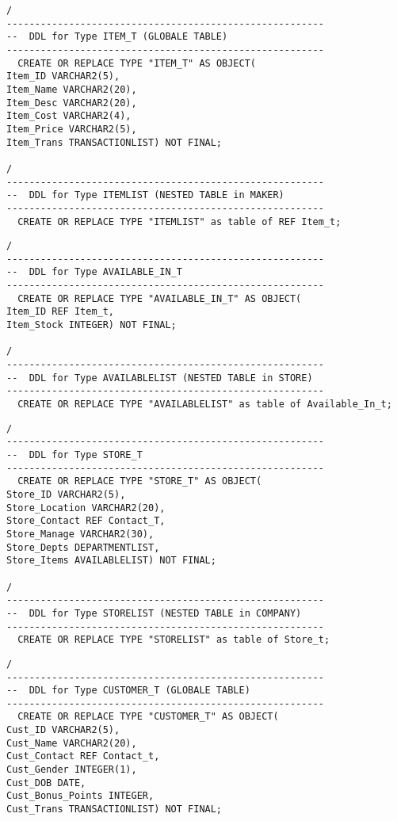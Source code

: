 \documentclass{scrartcl}
\begin{document}
\begin{lstlisting}
/
--------------------------------------------------------
--  DDL for Type ITEM_T (GLOBALE TABLE)
--------------------------------------------------------
  CREATE OR REPLACE TYPE "ITEM_T" AS OBJECT(
Item_ID VARCHAR2(5),
Item_Name VARCHAR2(20),
Item_Desc VARCHAR2(20),
Item_Cost VARCHAR2(4),
Item_Price VARCHAR2(5),
Item_Trans TRANSACTIONLIST) NOT FINAL; 

/
--------------------------------------------------------
--  DDL for Type ITEMLIST (NESTED TABLE in MAKER)
--------------------------------------------------------
  CREATE OR REPLACE TYPE "ITEMLIST" as table of REF Item_t;
\end{lstlisting}

\begin{lstlisting}
/
--------------------------------------------------------
--  DDL for Type AVAILABLE_IN_T
--------------------------------------------------------
  CREATE OR REPLACE TYPE "AVAILABLE_IN_T" AS OBJECT(
Item_ID REF Item_t,
Item_Stock INTEGER) NOT FINAL;

/
--------------------------------------------------------
--  DDL for Type AVAILABLELIST (NESTED TABLE in STORE)
--------------------------------------------------------
  CREATE OR REPLACE TYPE "AVAILABLELIST" as table of Available_In_t;
\end{lstlisting}

\begin{lstlisting}
/
--------------------------------------------------------
--  DDL for Type STORE_T
--------------------------------------------------------
  CREATE OR REPLACE TYPE "STORE_T" AS OBJECT(
Store_ID VARCHAR2(5),
Store_Location VARCHAR2(20),
Store_Contact REF Contact_T,
Store_Manage VARCHAR2(30),
Store_Depts DEPARTMENTLIST,
Store_Items AVAILABLELIST) NOT FINAL;

/
--------------------------------------------------------
--  DDL for Type STORELIST (NESTED TABLE in COMPANY)
--------------------------------------------------------
  CREATE OR REPLACE TYPE "STORELIST" as table of Store_t;
\end{lstlisting}

\begin{lstlisting}
/
--------------------------------------------------------
--  DDL for Type CUSTOMER_T (GLOBALE TABLE)
--------------------------------------------------------
  CREATE OR REPLACE TYPE "CUSTOMER_T" AS OBJECT(
Cust_ID VARCHAR2(5),
Cust_Name VARCHAR2(20),
Cust_Contact REF Contact_t,
Cust_Gender INTEGER(1),
Cust_DOB DATE,
Cust_Bonus_Points INTEGER,
Cust_Trans TRANSACTIONLIST) NOT FINAL;  
\end{lstlisting}
\end{document}
